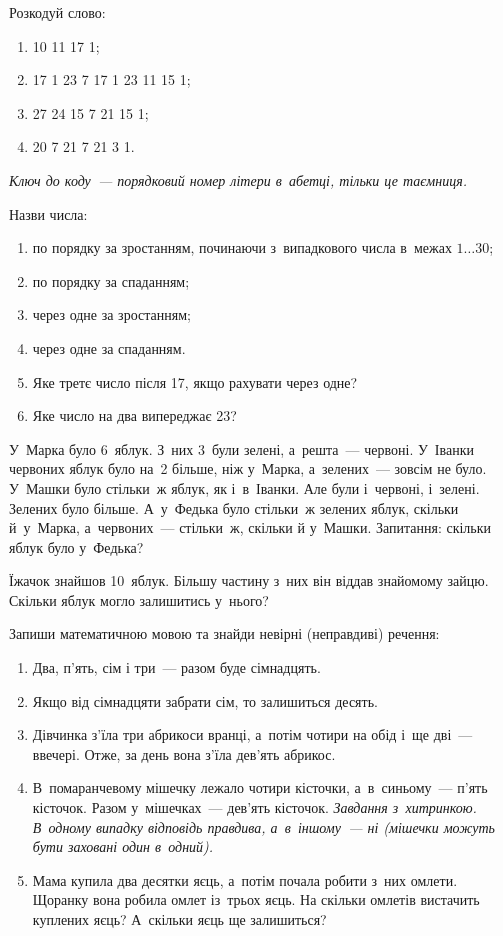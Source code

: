 \problem
Розкодуй слово:
\begin{enumerate}
    \item 10 11 17 1;
    \item 17 1 23 7 17 1 23 11 15 1;
    \item 27 24 15 7 21 15 1;
    \item 20 7 21 7 21 3 1.
\end{enumerate}

\emph{
Ключ до коду~--- порядковий номер літери в~абетці, тільки це таємниця.
}


\problem
Назви числа:
\begin{enumerate}
    \item по порядку за зростанням, починаючи з~випадкового числа
    в~межах $1\ldots30$;
    \item по порядку за спаданням;
    \item через одне за зростанням;
    \item через одне за спаданням.
    \item Яке третє число після 17, якщо рахувати через одне?
    \item Яке число на два випереджає 23?
\end{enumerate}


\problem
У~Марка було 6~яблук. З~них 3~були зелені, а~решта~--- червоні.
У~Іванки червоних яблук було на~2 більше, ніж у~Марка,
а~зелених~--- зовсім не було.
У~Машки було стільки~ж яблук, як і~в~Іванки.
Але були і~червоні, і~зелені. Зелених було більше.
А~у~Федька було стільки~ж зелених яблук, скільки й~у~Марка,
а~червоних~--- стільки~ж, скільки й у~Машки.
Запитання: скільки яблук було у~Федька?


\problem
Їжачок знайшов 10~яблук.
Більшу частину з~них він віддав знайомому зайцю.
Скільки яблук могло залишитись у~нього?


\problem
Запиши математичною мовою та знайди невірні (неправдиві) речення:
\begin{enumerate}
    \item Два, п'ять, сім і три~--- разом буде сімнадцять.
    \item Якщо від сімнадцяти забрати сім, то залишиться десять.
    \item Дівчинка з'їла три абрикоси вранці, а~потім чотири на обід
    і~ще дві~--- ввечері. Отже, за день вона з'їла дев'ять абрикос.
    \item В~помаранчевому мішечку лежало чотири кісточки,
    а~в~синьому~--- п'ять кісточок. Разом у~мішечках~--- дев'ять кісточок.
    \emph{Завдання з~хитринкою. В~одному випадку відповідь правдива,
    а~в~іншому~--- ні (мішечки можуть бути заховані один в~одний).}
    \item Мама купила два десятки яєць, а~потім почала робити з~них омлети.
    Щоранку вона робила омлет із~трьох яєць.
    На скільки омлетів вистачить куплених яєць? А~скільки яєць ще залишиться?
\end{enumerate}


